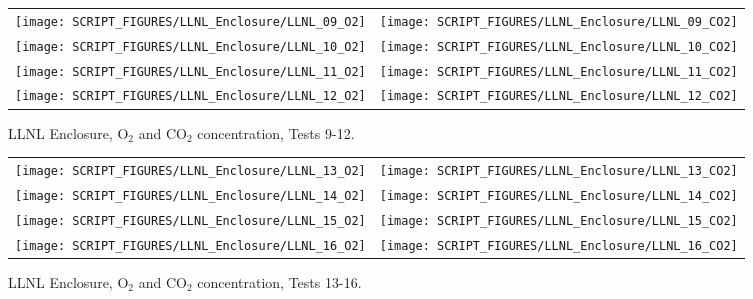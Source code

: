 \begin{figure}[p]
\begin{tabular*}{\textwidth}{l@{\extracolsep{\fill}}r}
\texttt{[image: SCRIPT\_FIGURES/LLNL\_Enclosure/LLNL\_09\_O2]} &
\texttt{[image: SCRIPT\_FIGURES/LLNL\_Enclosure/LLNL\_09\_CO2]} \\
\texttt{[image: SCRIPT\_FIGURES/LLNL\_Enclosure/LLNL\_10\_O2]} &
\texttt{[image: SCRIPT\_FIGURES/LLNL\_Enclosure/LLNL\_10\_CO2]} \\
\texttt{[image: SCRIPT\_FIGURES/LLNL\_Enclosure/LLNL\_11\_O2]} &
\texttt{[image: SCRIPT\_FIGURES/LLNL\_Enclosure/LLNL\_11\_CO2]} \\
\texttt{[image: SCRIPT\_FIGURES/LLNL\_Enclosure/LLNL\_12\_O2]} &
\texttt{[image: SCRIPT\_FIGURES/LLNL\_Enclosure/LLNL\_12\_CO2]}
\end{tabular*}
\caption[LLNL Enclosure, O$_2$ and CO$_2$ concentration, Tests 9-12]{LLNL Enclosure, O$_2$ and CO$_2$ concentration, Tests 9-12.}
\label{LLNL_Gas_3}
\end{figure}

\begin{figure}[p]
\begin{tabular*}{\textwidth}{l@{\extracolsep{\fill}}r}
\texttt{[image: SCRIPT\_FIGURES/LLNL\_Enclosure/LLNL\_13\_O2]} &
\texttt{[image: SCRIPT\_FIGURES/LLNL\_Enclosure/LLNL\_13\_CO2]} \\
\texttt{[image: SCRIPT\_FIGURES/LLNL\_Enclosure/LLNL\_14\_O2]} &
\texttt{[image: SCRIPT\_FIGURES/LLNL\_Enclosure/LLNL\_14\_CO2]} \\
\texttt{[image: SCRIPT\_FIGURES/LLNL\_Enclosure/LLNL\_15\_O2]} &
\texttt{[image: SCRIPT\_FIGURES/LLNL\_Enclosure/LLNL\_15\_CO2]} \\
\texttt{[image: SCRIPT\_FIGURES/LLNL\_Enclosure/LLNL\_16\_O2]} &
\texttt{[image: SCRIPT\_FIGURES/LLNL\_Enclosure/LLNL\_16\_CO2]}
\end{tabular*}
\caption[LLNL Enclosure, O$_2$ and CO$_2$ concentration, Tests 13-16]{LLNL Enclosure, O$_2$ and CO$_2$ concentration, Tests 13-16.}
\label{LLNL_Gas_4}
\end{figure}

